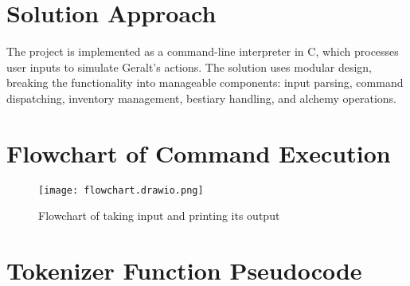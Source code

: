 \documentclass{article}
\begin{document}
\section*{Solution Approach}
The project is implemented as a command-line interpreter in C, which processes user inputs to simulate Geralt’s actions. The solution uses modular design, breaking the functionality into manageable components: input parsing, command dispatching, inventory management, bestiary handling, and alchemy operations.

\section*{Flowchart of Command Execution}

\begin{figure}[h!]
    \centering
    \texttt{[image: flowchart.drawio.png]}
    \caption{Flowchart of taking input and printing its output}
    \label{fig:flowchart}
\end{figure}

\section*{Tokenizer Function Pseudocode}
\end{document}
